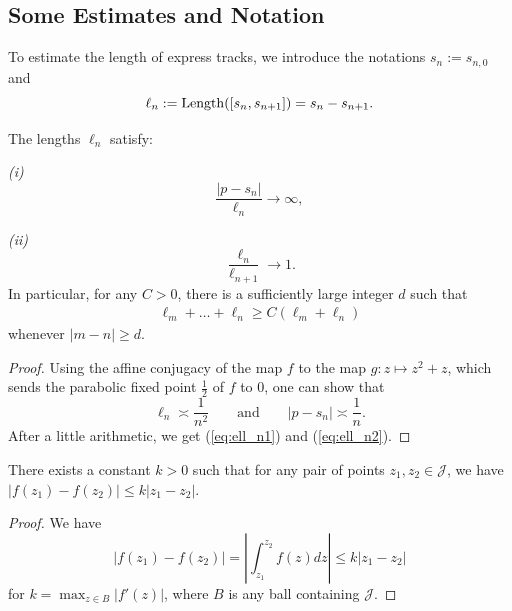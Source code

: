 \subsection{Some Estimates and Notation}

To estimate the length of express tracks, we introduce the notations $s_n := s_{n, 0}$ and 
\begin{equation}
	\ell_n := \operatorname{Length}([s_{n},s_{n+1}]) = s_{n}-s_{n+1}.
\end{equation}

\begin{lemma} \label{lem-ell_n}
	The lengths ${\ell_n}$ satisfy:
	
	{\em (i)}
	\begin{equation}
	\label{eq:ell_n1}
		\frac {|p-s_n|}{\ell_n} \to \infty,
	\end{equation}
	
	{\em (ii)}
	\begin{equation}
	\label{eq:ell_n2}
		\frac{\ell_n}{\ell_{n+1}} \to 1.
	\end{equation}
	In particular, for any $C > 0$, there is a sufficiently large integer $d$ such that
	\begin{align*}
		\ell_{m}+\ldots+\ell_{n} \geq C (\ell_m+\ell_n)
	\end{align*}
	whenever $|m-n| \geq d$.
\end{lemma}

\begin{proof}
Using the affine conjugacy of the map $f$ to the map $g: z\mapsto z^2+z$, which sends the parabolic fixed point $\frac{1}{2}$ of $f$ to $0$, one can show that
$$
\ell_n \asymp \frac{1}{n^2} \qquad \text{and} \qquad |p - s_n| \asymp \frac{1}{n}.
$$
After a little arithmetic, we get (\ref{eq:ell_n1}) and (\ref{eq:ell_n2}).
\end{proof}


\begin{lemma}
There exists a constant $k>0$ such that for any pair of points $z_1, z_2 \in \mathcal J$, we have 
$|f(z_1)-f(z_2)| \leq k|z_1-z_2|$.
\end{lemma}

\begin{proof}
	We have 
	\begin{equation}
		|f(z_1)-f(z_2)| = \left |\int_{z_1} ^{z_2} f(z) dz \right | \leq k|z_1-z_2|	
	\end{equation}
for $k=\max_{z \in B} |f'(z)|$, where $B$ is any ball containing $\mathcal J$. 
\end{proof}
 
